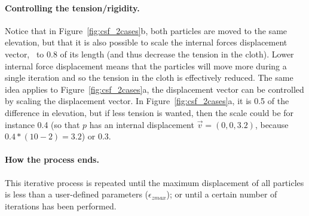 \paragraph{Controlling the tension/rigidity.}
Notice that in Figure~\ref{fig:csf_2cases}b, both particles are moved to the same elevation, but that it is also possible to scale the internal forces displacement vector, \eg\ to 0.8 of its length (and thus decrease the tension in the cloth). Lower internal force displacement means that the particles will move more during a single iteration and so the tension in the cloth is effectively reduced. 
The same idea applies to Figure~\ref{fig:csf_2cases}a, the displacement vector can be controlled by scaling the displacement vector. 
In Figure~\ref{fig:csf_2cases}a, it is 0.5 of the difference in elevation, but if less tension is wanted, then the scale could be for instance 0.4 (so that $p$ has an internal displacement $\vec{v}=(0, 0, 3.2)$, because $0.4 * (10-2) = 3.2$) or 0.3.


\paragraph{How the process ends.}
This iterative process is repeated until the maximum displacement of all particles is less than a user-defined parameters ($\epsilon_{zmax}$); or until a certain number of iterations has been performed.

%

